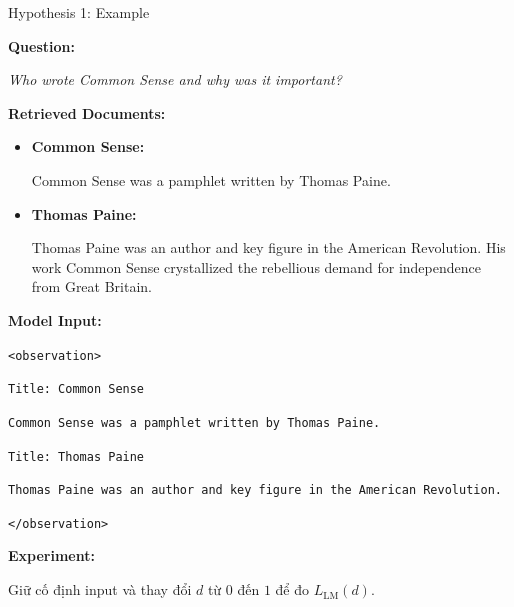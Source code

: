 \begin{frame}{Hypothesis 1: Example}

\textbf{Question:}

\textit{Who wrote Common Sense and why was it important?}

\vspace{0.25cm}

\textbf{Retrieved Documents:}

\begin{itemize}
    \item \textbf{Common Sense:}

    Common Sense was a pamphlet written by Thomas Paine.

    \item \textbf{Thomas Paine:}

    Thomas Paine was an author and key figure in the American Revolution. His work Common Sense crystallized the rebellious demand for independence from Great Britain.
\end{itemize}

\vspace{0.2cm}

\textbf{Model Input:}

\texttt{<observation>}

\vspace{0.1cm}

\texttt{Title: Common Sense}

\texttt{Common Sense was a pamphlet written by Thomas Paine.}

\vspace{0.1cm}

\texttt{Title: Thomas Paine}

\texttt{Thomas Paine was an author and key figure in the American Revolution.}

\vspace{0.1cm}

\texttt{</observation>}

\vspace{0.2cm}

\textbf{Experiment:}

Giữ cố định input và thay đổi $d$ từ $0$ đến $1$ để đo $L_{\mathrm{LM}}(d)$.

\end{frame}


